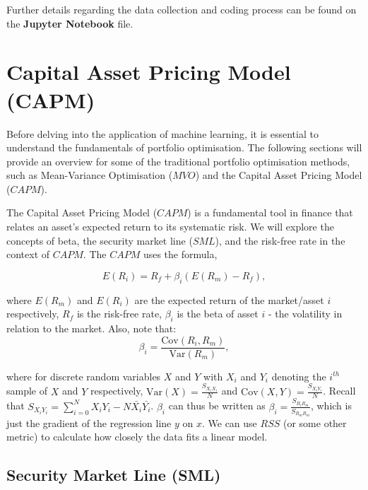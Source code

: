 \documentclass[a4paper,12pt,titlepage]{article}
\numberwithin{equation}{section}
\begin{document}
	\begin{tcolorbox}[colback=green!5, colframe=green!35!black, title=\textbf{Python Code}]

		Further details regarding the data collection and coding process can be found on the \textbf{Jupyter Notebook} file.

	\end{tcolorbox}

\section{Capital Asset Pricing Model (CAPM)}
\label{Capital Asset Pricing Model}

Before delving into the application of machine learning, it is essential to understand the fundamentals of 
portfolio optimisation. The following sections will provide an overview for some of the traditional portfolio optimisation methods, 
such as Mean-Variance Optimisation ($MVO$) and the Capital Asset Pricing Model ($CAPM$). \newline \par \noindent The Capital Asset Pricing 
Model ($CAPM$) is a fundamental tool in finance that relates an asset's expected return to its systematic risk. We will explore the 
concepts of beta, the security market line ($SML$), and the risk-free rate in the context of $CAPM$. The $CAPM$ uses the formula,

$$ E(R_i) = R_f + {\beta}_i (E(R_m) - R_f), $$ \par \noindent where $E(R_m)$ and $E(R_i)$ are the 
expected return of the market/asset $i$ respectively, $R_f$ is the risk-free rate, ${\beta}_i$ is the beta of asset $i$ - 
the volatility in relation to the market. Also, note that: $${\beta}_i = \frac{\text{Cov}(R_i, R_m)}{\text{Var}(R_m)},$$ \par \noindent where for
discrete random variables $X$ and $Y$ with $X_{i}$ and $Y_{i}$ denoting the $i^{th}$ sample of $X$ and $Y$ 
respectively, $\text{Var}(X) = \frac{S_{X_{i}X_{i}}}{N}$ and $\text{Cov}(X,Y) = \frac{S_{X_{i}Y_{i}}}{N}$. 
Recall that $S_{X_{i}Y_{i}} = \sum_{i=0}^{N} X_{i}Y_{i} - N \bar{X_{i}} \bar{Y_{i}}$. $\beta_{i}$ can thus 
be written as $\beta_{i} = \frac{S_{R_{i} R_{m}}}{S_{R_{m} R_{m}}}$, which is just the gradient of the 
regression line $y$ on $x$. We can use $RSS$ (or some other metric) to calculate how closely the data fits a linear model.

\subsection{Security Market Line (SML)}
\end{document}

